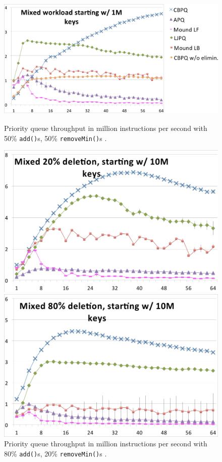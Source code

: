 \begin{figure}[htb]
	\centering
	\begin{minipage}[b]{.7\textwidth}
		\centering
		\includegraphics[width=\linewidth]{graphics/cbpq_50add_50.png}
		\caption{Priority queue throughput in million instructions per second with 50\% \texttt{add()}s, 50\% \texttt{removeMin()}s \cite{braginsky_cbpq:_2016}.}
		\label{fig:cbpq_50}
	\end{minipage}
	\hfill%
	\begin{minipage}[b]{.495\textwidth}
		\centering
		\includegraphics[width=\linewidth]{graphics/cbpq_80add_20.png}
		\caption{Priority queue throughput in million instructions per second with 80\% \texttt{add()}s, 20\% \texttt{removeMin()}s \cite{braginsky_cbpq:_2016}.}
		\label{fig:cbpq_80}
	\end{minipage}
	\begin{minipage}[b]{.495\textwidth}
		\centering
		\includegraphics[width=\linewidth]{graphics/cbpq_20add_80.png}

\end{minipage}
\end{figure}
